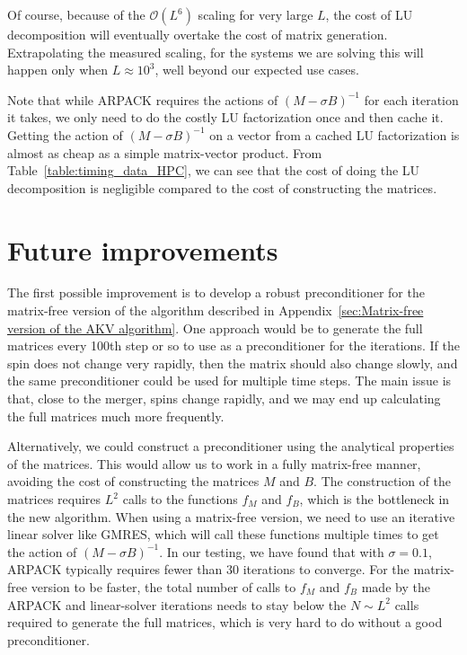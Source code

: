 \documentclass{iopjournal}
\begin{document}
Of course, because of the $\mathcal{O}(L^6)$ scaling for very large $L$, the
cost of LU decomposition will eventually overtake the cost of matrix
generation. Extrapolating the measured scaling, for the systems we are
solving this will happen only when $L \approx 10^3$, well beyond our
expected use cases.

Note that while ARPACK requires the actions of $(M- \sigma B)^{-1}$
for each iteration it takes, we only need to do the costly LU
factorization once and then cache it. Getting the action of $(M-
\sigma B)^{-1}$ on a vector from a cached LU factorization is almost as cheap
as a simple matrix-vector product. From Table~\ref{table:timing_data_HPC}, we can see that the cost of doing the LU
decomposition is negligible compared to the cost of constructing the
matrices.


\section{\label{sec:Future improvements} Future improvements}

The first possible improvement is to develop a robust preconditioner for the matrix-free version of the algorithm described in Appendix~\ref{sec:Matrix-free version of the AKV algorithm}. One approach would be to generate the full matrices every 100th step or so to use as a preconditioner for the iterations. If the spin does not change very rapidly, then the matrix should also change slowly, and the same preconditioner could be used for multiple time steps. The main issue is that, close to the merger, spins change rapidly, and we may end up calculating the full matrices much more frequently. 

Alternatively, we could construct a preconditioner using the analytical properties of the matrices. This would allow us to work in a fully matrix-free manner, avoiding the cost of constructing the matrices $M$ and $B$. The construction of the matrices requires $L^2$ calls to the functions $f_M$ and $f_B$, which is the bottleneck in the new algorithm. When using a matrix-free version, we need to use an iterative linear solver like GMRES, which will call these functions multiple times to get the action of $(M-\sigma B)^{-1}$. In our testing, we have found that with $\sigma = 0.1$, ARPACK typically requires fewer than 30 iterations to converge. For the matrix-free version to be faster, the total number of calls to $f_M$ and $f_B$ made by the ARPACK and linear-solver iterations needs to stay below the $N\sim L^2$ calls required to generate the full matrices, which is very hard to do without a good preconditioner. 
\end{document}
